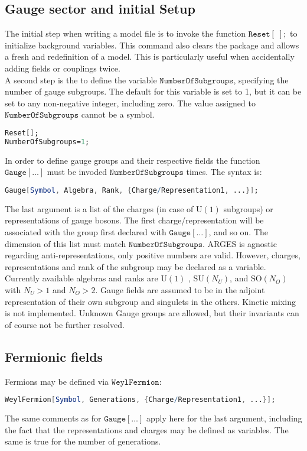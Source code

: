 \documentclass{scrartcl}
\begin{document}
\subsection{Gauge sector and initial Setup}
The initial step when writing a model file is to invoke the function $\mathtt{Reset[\;];}$ to initialize background variables. This command also clears the package and allows a fresh and redefinition of a model. This is particularly useful when accidentally adding fields or couplings twice. \\
A second step is the to define the variable $\mathtt{NumberOfSubgroups}$, specifying the number of gauge subgroups. The default for this variable is set to 1, but it can be set to any non-negative integer, including zero. The value assigned to $\mathtt{NumberOfSubgroups}$ cannot be a symbol.
\vspace{1em}
\begin{lstlisting}[language=mathematica,mathescape,columns=flexible,backgroundcolor=\color{light-gray}]
Reset[];
NumberOfSubgroups=1;
\end{lstlisting}
\vspace{1em}
In order to define gauge groups and their respective fields the function $\mathtt{Gauge[\dots]}$ must be invoded $\mathtt{NumberOfSubgroups}$ times. The syntax is:
\begin{lstlisting}[language=mathematica,mathescape,columns=flexible,backgroundcolor=\color{light-gray}]
Gauge[Symbol, Algebra, Rank, {Charge/Representation1, ...}];
\end{lstlisting}
The last argument is a list of the charges (in case of $\mathrm{U}(1)$ subgroups) or representations of gauge bosons. The first charge/representation will be associated with the group first declared with $\mathtt{Gauge[\dots]}$, and so on. The dimension of this list must match $\mathtt{NumberOfSubgroups}$. ARGES is agnostic regarding anti-representations, only positive numbers are valid. However, charges, representations and rank of the subgroup may be declared as a variable. \newline Currently available algebras and ranks are $\mathrm{U}(1)$ , $\mathrm{SU}(N_U)$, and $\mathrm{SO}(N_O)$ with $N_U > 1$ and $N_O > 2$. Gauge fields are assumed to be in the adjoint representation of their own subgroup and singulets in the others. Kinetic mixing is not implemented. \newline Unknown Gauge groups are allowed, but their invariants can of course not be further resolved.
\FloatBarrier
\subsection{Fermionic fields}
Fermions may be defined via $\mathtt{WeylFermion}$:
\begin{lstlisting}[language=mathematica,mathescape,columns=flexible,backgroundcolor=\color{light-gray}]
WeylFermion[Symbol, Generations, {Charge/Representation1, ...}];
\end{lstlisting}
The same comments as for $\mathtt{Gauge[\dots]}$ apply here for the last argument, including the fact that the representations and charges may be defined as variables. The same is true for the number of generations.
\FloatBarrier
\end{document}
